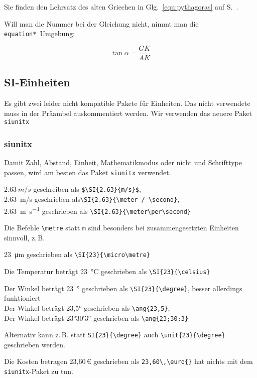 		Sie finden den Lehrsatz des alten Griechen in Glg.~\ref{equ:pythagoras} auf S.~\pageref{equ:pythagoras}.

		Will man die Nummer bei der Gleichung nicht, nimmt man die \verb|equation*|~Umgebung:

		\begin{equation*}
			\tan{\alpha}=\frac{GK}{AK}
		\end{equation*}

		\subsection{SI-Einheiten}
			Es gibt zwei leider nicht kompatible Pakete für Einheiten. Das nicht verwendete muss in der Präambel auskommentiert werden. Wir verwenden das neuere Paket \verb|siunitx|

			\subsubsection{siunitx}
				 Damit Zahl, Abstand, Einheit, Mathematikmodus oder nicht und Schrifttype passen, wird am besten das Paket \verb|siunitx| verwendet.

				 $\SI{2.63}{m/s} $ geschreiben als \verb|$\SI{2.63}{m/s}$|, \\
				 \SI{2.63}{\meter / \second}  geschrieben als\verb|\SI{2.63}{\meter / \second}|, \\
				 \SI{2.63}{\meter\per\second} geschrieben als \verb|\SI{2.63}{\meter\per\second}|

				Die Befehle \verb|\metre| statt \verb|m| sind besonders bei zusammengesetzten Einheiten sinnvoll, z.\,B.

				\SI{23}{\micro\metre} geschrieben als   \verb|\SI{23}{\micro\metre}|

				Die Temperatur beträgt \SI{23}{\celsius} geschrieben als   \verb|\SI{23}{\celsius}|

				Der Winkel beträgt \SI{23}{\degree} geschrieben als   \verb|\SI{23}{\degree}|, besser allerdings funktioniert\\
				Der Winkel beträgt \ang{23,5} geschrieben als   \verb|\ang{23,5}|,\\
				Der Winkel beträgt \ang{23;30;3} geschrieben als   \verb|\ang{23;30;3}|


				Alternativ kann z.\,B. statt \verb|SI{23}{\degree}| auch \verb|\unit{23}{\degree}| geschrieben werden.

				Die Kosten betragen 23,60\,\euro{} geschrieben als \verb|23,60\,\euro{}| hat nichts mit dem \verb|siunitx|-Paket zu tun.




